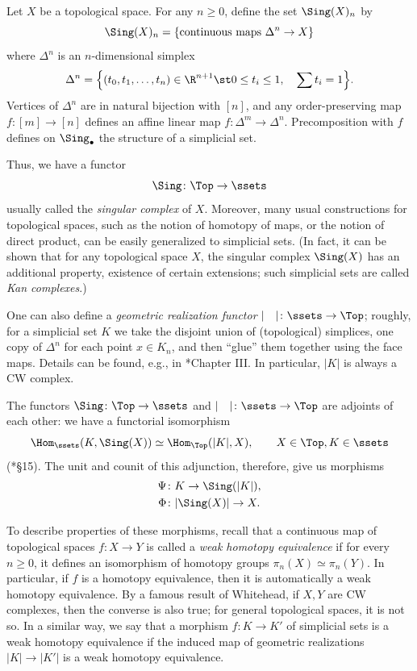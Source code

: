\begin{example}\label{x:top-sset}
  Let $X$ be a topological space. For any $n\ge 0$, define the set
  $\Sing(X)_n$ by
  $$
    \Sing(X)_n= \{\text{continuous maps }\Delta^n\to X\}
  $$
  where $\Delta^n$ is an $n$-dimensional simplex
  \begin{equation}\label{e:simplex}
    \Delta^n=\Bigl\{
              (t_0, t_1, \dots, t_n)\in \R^{n+1}\st
              0\le t_i \le 1, \quad \sum t_i=1
             \Bigr\}.
  \end{equation}
  Vertices of $\Delta^n$ are in natural bijection with $[n]$, and any
  order-preserving map $f\colon [m]\to [n]$ defines an affine linear
  map $f\colon \Delta^m \to \Delta^n$. Precomposition with $f$ defines on
  $\Sing_\bullet$ the structure of a simplicial set.
\end{example}
Thus, we have a functor
$$
  \Sing\colon \Top \to \ssets
$$
usually called the \emph{singular complex} of $X$.
Moreover, many usual constructions for topological spaces, such as the notion of
homotopy of maps, or the notion of direct product, can be easily generalized to
simplicial sets. (In fact, it can be shown that for any topological space $X$,
the singular complex $\Sing(X)$ has an additional property, existence of
certain extensions; such simplicial sets are called \emph{Kan complexes}.)

One can also define a \emph{geometric realization
functor} $|\quad|\colon \ssets\to \Top$;
roughly, for a simplicial set $K$ we take the disjoint union of (topological)
simplices, one copy of $\Delta^n$ for each point $x\in K_n$, and then ``glue''
them together using the face maps. Details can be found, e.g., in
*{Chapter III}. In particular, $|K|$ is always a CW complex.

The functors $\Sing\colon \Top\to \ssets$ and $|\quad|\colon \ssets\to \Top$ are
adjoints of each other: we have a functorial isomorphism
$$
  \Hom_{\ssets}(K, \Sing(X))\simeq \Hom_{\Top}(|K|, X),
  \qquad X\in \Top, K\in \ssets
$$
(*{\S 15}). The unit and counit of this adjunction, therefore,
give us morphisms
\begin{align*}
  \Psi&\colon K\to \Sing(|K|),\\
  \Phi&\colon |\Sing(X)|\to X.
\end{align*}


To describe properties of these morphisms, recall that a
continuous map of topological spaces $f\colon X\to Y$ is called a \emph{weak
homotopy equivalence} if for every $n\ge0$, it
defines an isomorphism of homotopy groups $\pi_n(X)\simeq \pi_n(Y)$. In
particular, if $f$ is a homotopy equivalence, then it is automatically a weak
homotopy equivalence. By a famous result of Whitehead, if $X,Y$ are CW
complexes, then the converse is also true; for general topological spaces, it is
not so. In a similar way, we say that a morphism $f\colon K\to K'$ of
simplicial sets is a weak homotopy equivalence if the induced map of geometric
realizations $|K|\to |K'|$ is a weak homotopy equivalence.

